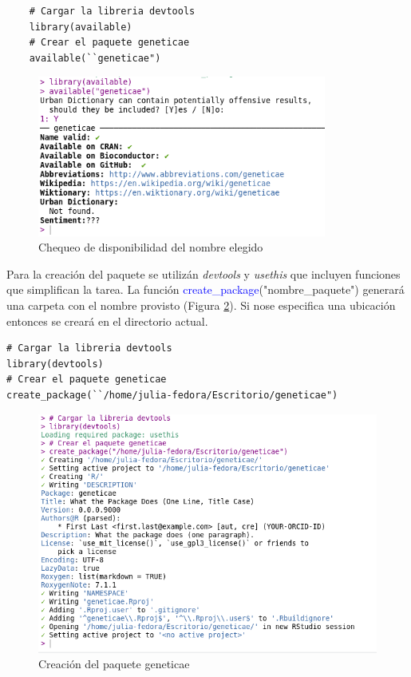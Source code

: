 \begin{lstlisting}
	# Cargar la libreria devtools
	library(available)
	# Crear el paquete geneticae
	available(``geneticae")
\end{lstlisting}


 \begin{figure}[H]
\begin{center}
	\includegraphics[width=9.5cm]{./Graficos/available.png}	
\end{center}
	\caption{Chequeo de disponibilidad del nombre elegido}
\label{fig:fig31}
\end{figure}


Para la creación del paquete se utilizán  \emph{devtools} y  \emph{usethis} que incluyen funciones que simplifican la tarea. La función \textcolor{blue}{create\_package}("nombre\_paquete") generará una carpeta con el nombre provisto (Figura \ref{fig:fig32}). Si nose especifica una ubicación entonces se creará en el directorio actual.


\begin{lstlisting}
# Cargar la libreria devtools
library(devtools)
# Crear el paquete geneticae
create_package(``/home/julia-fedora/Escritorio/geneticae")
\end{lstlisting}


 \begin{figure}[H]
	\begin{center}
		\includegraphics[width=13cm]{./Graficos/creacion.png}	
	\end{center}
	\caption{Creación del paquete geneticae}
	\label{fig:fig32}
\end{figure}


